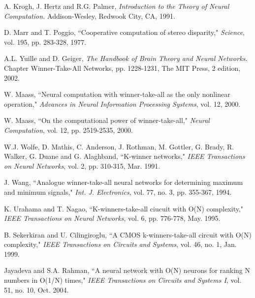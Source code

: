 \documentclass[conference]{IEEEtran}
\begin{document}
\def\V{\rm vol.~}
\def\N{no.~}
\def\pp{pp.~}
\def\Pot{\it Proc. }
\def\IJCNN{\it International Joint Conference on Neural Networks\rm }
\def\ACC{\it American Control Conference\rm }
\def\SMC{\it IEEE Trans. Systems\rm , \it Man\rm , and \it Cybernetics\rm }

\def\handb{ \it Handbook of Intelligent Control: Neural\rm , \it
    Fuzzy\rm , \it and Adaptive Approaches \rm }

\begin{thebibliography}{1}
 A. Krogh, J. Hertz and R.G. Palmer,
        {\it Introduction to the Theory of Neural Computation.}
        Addison-Wesley, Redwook City, CA, 1991.

 D. Marr and T. Poggio, ``Cooperative computation of stereo disparity,"
        {\it Science}, vol. 195, pp. 283-328, 1977.

 A.L. Yuille and D. Geiger,
        {\it The Handbook of Brain Theory and Neural Networks.}
        Chapter Winner-Take-All Networks, pp. 1228-1231, The MIT Press, 2 edition, 2002.

 W. Maass, ``Neural computation with winner-take-all as the only nonlinear
operation,"
        {\it Advances in Neural Information Processing Systems}, vol. 12, 2000.

 W. Maass, ``On the computational power of
winner-take-all,"
        {\it Neural Computation}, vol. 12, pp. 2519-2535, 2000.

 W.J. Wolfe, D. Mathis, C. Anderson, J. Rothman, M. Gottler, G. Brady, R. Walker, G. Duane and G. Alaghband, ``K-winner networks,"
        {\it IEEE Transactions on Neural Networks}, vol. 2, pp. 310-315, Mar. 1991.

 J. Wang, ``Analogue winner-take-all neural networks for determining maximum and minimum signals,"
        {\it Int. J. Electronics}, vol. 77, no. 3, pp. 355-367, 1994.

 K. Urahama and T. Nagao, ``K-winners-take-all ciucuit with O(N) complexity,"
        {\it IEEE Transactions on Neural Networks}, vol. 6, pp. 776-778, May. 1995.

 B. Sekerkiran and U. Cilingiroglu, ``A CMOS k-winners-take-all circuit with O(N) complexity,"
        {\it IEEE Transactions on Circuits and Systems}, vol. 46, no. 1, Jan. 1999.

 Jayadeva and S.A. Rahman, ``A neural network with O(N) neurons for ranking N numbers in O(1/N) times,"
        {\it IEEE Transactions on Circuits and Systems I}, vol. 51, no. 10, Oct. 2004.


\end{thebibliography}
\end{document}
